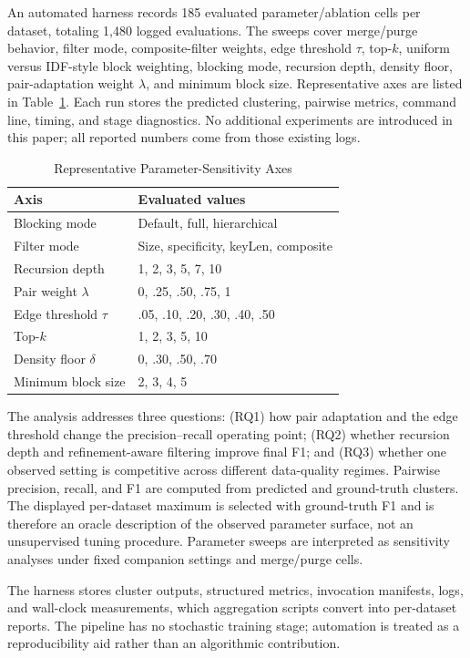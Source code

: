 \documentclass[conference]{IEEEtran}
\begin{document}
An automated harness records 185 evaluated parameter/ablation cells per dataset, totaling 1,480 logged evaluations. The sweeps cover merge/purge behavior, filter mode, composite-filter weights, edge threshold $\tau$, top-$k$, uniform versus IDF-style block weighting, blocking mode, recursion depth, density floor, pair-adaptation weight $\lambda$, and minimum block size. Representative axes are listed in Table~\ref{tab:grid}. Each run stores the predicted clustering, pairwise metrics, command line, timing, and stage diagnostics. No additional experiments are introduced in this paper; all reported numbers come from those existing logs.

\begin{table}[t]
\caption{Representative Parameter-Sensitivity Axes}
\label{tab:grid}
\centering
\scriptsize
\setlength{\tabcolsep}{3.5pt}
\begin{tabular}{ll}
\toprule
Axis & Evaluated values \\
\midrule
Blocking mode & Default, full, hierarchical \\
Filter mode & Size, specificity, keyLen, composite \\
Recursion depth & 1, 2, 3, 5, 7, 10 \\
Pair weight $\lambda$ & 0, .25, .50, .75, 1 \\
Edge threshold $\tau$ & .05, .10, .20, .30, .40, .50 \\
Top-$k$ & 1, 2, 3, 5, 10 \\
Density floor $\delta$ & 0, .30, .50, .70 \\
Minimum block size & 2, 3, 4, 5 \\
\bottomrule
\end{tabular}
\end{table}

The analysis addresses three questions: (RQ1) how pair adaptation and the edge threshold change the precision--recall operating point; (RQ2) whether recursion depth and refinement-aware filtering improve final F1; and (RQ3) whether one observed setting is competitive across different data-quality regimes. Pairwise precision, recall, and F1 are computed from predicted and ground-truth clusters. The displayed per-dataset maximum is selected with ground-truth F1 and is therefore an oracle description of the observed parameter surface, not an unsupervised tuning procedure. Parameter sweeps are interpreted as sensitivity analyses under fixed companion settings and merge/purge cells.

The harness stores cluster outputs, structured metrics, invocation manifests, logs, and wall-clock measurements, which aggregation scripts convert into per-dataset reports. The pipeline has no stochastic training stage; automation is treated as a reproducibility aid rather than an algorithmic contribution.
\end{document}
